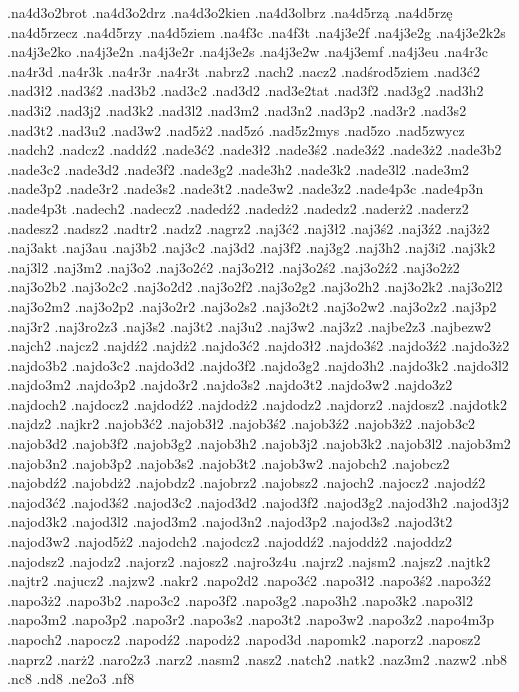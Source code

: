 {.na4d3o2brot
.na4d3o2drz
.na4d3o2kien
.na4d3olbrz
.na4d5rzą
.na4d5rzę
.na4d5rzecz
.na4d5rzy
.na4d5ziem
.na4f3c
.na4f3t
.na4j3e2f
.na4j3e2g
.na4j3e2k2s
.na4j3e2ko
.na4j3e2n
.na4j3e2r
.na4j3e2s
.na4j3e2w
.na4j3emf
.na4j3eu
.na4r3c
.na4r3d
.na4r3k
.na4r3r
.na4r3t
.nabrz2
.nach2
.nacz2
.nadśrod5ziem
.nad3ć2
.nad3ł2
.nad3ś2
.nad3b2
.nad3c2
.nad3d2
.nad3e2tat
.nad3f2
.nad3g2
.nad3h2
.nad3i2
.nad3j2
.nad3k2
.nad3l2
.nad3m2
.nad3n2
.nad3p2
.nad3r2
.nad3s2
.nad3t2
.nad3u2
.nad3w2
.nad5ż2
.nad5zó
.nad5z2mys
.nad5zo
.nad5zwycz
.nadch2
.nadcz2
.naddź2
.nade3ć2
.nade3ł2
.nade3ś2
.nade3ź2
.nade3ż2
.nade3b2
.nade3c2
.nade3d2
.nade3f2
.nade3g2
.nade3h2
.nade3k2
.nade3l2
.nade3m2
.nade3p2
.nade3r2
.nade3s2
.nade3t2
.nade3w2
.nade3z2
.nade4p3c
.nade4p3n
.nade4p3t
.nadech2
.nadecz2
.nadedź2
.nadedż2
.nadedz2
.naderż2
.naderz2
.nadesz2
.nadsz2
.nadtr2
.nadz2
.nagrz2
.naj3ć2
.naj3ł2
.naj3ś2
.naj3ź2
.naj3ż2
.naj3akt
.naj3au
.naj3b2
.naj3c2
.naj3d2
.naj3f2
.naj3g2
.naj3h2
.naj3i2
.naj3k2
.naj3l2
.naj3m2
.naj3o2
.naj3o2ć2
.naj3o2ł2
.naj3o2ś2
.naj3o2ź2
.naj3o2ż2
.naj3o2b2
.naj3o2c2
.naj3o2d2
.naj3o2f2
.naj3o2g2
.naj3o2h2
.naj3o2k2
.naj3o2l2
.naj3o2m2
.naj3o2p2
.naj3o2r2
.naj3o2s2
.naj3o2t2
.naj3o2w2
.naj3o2z2
.naj3p2
.naj3r2
.naj3ro2z3
.naj3s2
.naj3t2
.naj3u2
.naj3w2
.naj3z2
.najbe2z3
.najbezw2
.najch2
.najcz2
.najdź2
.najdż2
.najdo3ć2
.najdo3ł2
.najdo3ś2
.najdo3ź2
.najdo3ż2
.najdo3b2
.najdo3c2
.najdo3d2
.najdo3f2
.najdo3g2
.najdo3h2
.najdo3k2
.najdo3l2
.najdo3m2
.najdo3p2
.najdo3r2
.najdo3s2
.najdo3t2
.najdo3w2
.najdo3z2
.najdoch2
.najdocz2
.najdodź2
.najdodż2
.najdodz2
.najdorz2
.najdosz2
.najdotk2
.najdz2
.najkr2
.najob3ć2
.najob3ł2
.najob3ś2
.najob3ź2
.najob3ż2
.najob3c2
.najob3d2
.najob3f2
.najob3g2
.najob3h2
.najob3j2
.najob3k2
.najob3l2
.najob3m2
.najob3n2
.najob3p2
.najob3s2
.najob3t2
.najob3w2
.najobch2
.najobcz2
.najobdź2
.najobdż2
.najobdz2
.najobrz2
.najobsz2
.najoch2
.najocz2
.najodź2
.najod3ć2
.najod3ś2
.najod3c2
.najod3d2
.najod3f2
.najod3g2
.najod3h2
.najod3j2
.najod3k2
.najod3l2
.najod3m2
.najod3n2
.najod3p2
.najod3s2
.najod3t2
.najod3w2
.najod5ż2
.najodch2
.najodcz2
.najoddź2
.najoddż2
.najoddz2
.najodsz2
.najodz2
.najorz2
.najosz2
.najro3z4u
.najrz2
.najsm2
.najsz2
.najtk2
.najtr2
.najucz2
.najzw2
.nakr2
.napo2d2
.napo3ć2
.napo3ł2
.napo3ś2
.napo3ź2
.napo3ż2
.napo3b2
.napo3c2
.napo3f2
.napo3g2
.napo3h2
.napo3k2
.napo3l2
.napo3m2
.napo3p2
.napo3r2
.napo3s2
.napo3t2
.napo3w2
.napo3z2
.napo4m3p
.napoch2
.napocz2
.napodź2
.napodż2
.napod3d
.napomk2
.naporz2
.naposz2
.naprz2
.narż2
.naro2z3
.narz2
.nasm2
.nasz2
.natch2
.natk2
.naz3m2
.nazw2
.nb8
.nc8
.nd8
.ne2o3
.nf8
}
